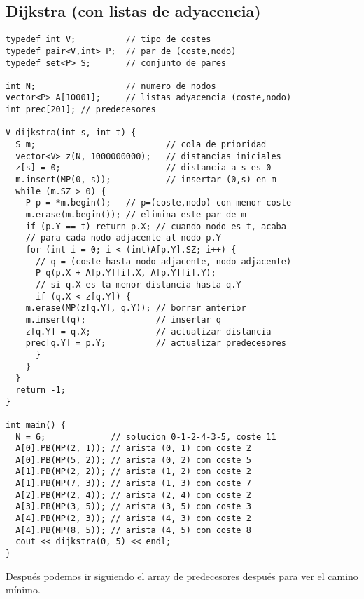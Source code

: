 \documentclass[10pt, a4, oneside]{article}
\begin{document}
\subsection{Dijkstra (con listas de adyacencia)}
\begin{verbatim}
typedef int V;          // tipo de costes
typedef pair<V,int> P;  // par de (coste,nodo)
typedef set<P> S;       // conjunto de pares

int N;                  // numero de nodos
vector<P> A[10001];     // listas adyacencia (coste,nodo)
int prec[201]; // predecesores

V dijkstra(int s, int t) {
  S m;                          // cola de prioridad
  vector<V> z(N, 1000000000);   // distancias iniciales
  z[s] = 0;                     // distancia a s es 0
  m.insert(MP(0, s));           // insertar (0,s) en m
  while (m.SZ > 0) {
    P p = *m.begin();   // p=(coste,nodo) con menor coste
    m.erase(m.begin()); // elimina este par de m
    if (p.Y == t) return p.X; // cuando nodo es t, acaba
    // para cada nodo adjacente al nodo p.Y
    for (int i = 0; i < (int)A[p.Y].SZ; i++) {
      // q = (coste hasta nodo adjacente, nodo adjacente)
      P q(p.X + A[p.Y][i].X, A[p.Y][i].Y);
      // si q.X es la menor distancia hasta q.Y
      if (q.X < z[q.Y]) {
    m.erase(MP(z[q.Y], q.Y)); // borrar anterior
    m.insert(q);              // insertar q
    z[q.Y] = q.X;             // actualizar distancia
    prec[q.Y] = p.Y;          // actualizar predecesores
      }
    }
  }
  return -1;
}

int main() {
  N = 6;             // solucion 0-1-2-4-3-5, coste 11
  A[0].PB(MP(2, 1)); // arista (0, 1) con coste 2
  A[0].PB(MP(5, 2)); // arista (0, 2) con coste 5
  A[1].PB(MP(2, 2)); // arista (1, 2) con coste 2
  A[1].PB(MP(7, 3)); // arista (1, 3) con coste 7
  A[2].PB(MP(2, 4)); // arista (2, 4) con coste 2
  A[3].PB(MP(3, 5)); // arista (3, 5) con coste 3
  A[4].PB(MP(2, 3)); // arista (4, 3) con coste 2
  A[4].PB(MP(8, 5)); // arista (4, 5) con coste 8
  cout << dijkstra(0, 5) << endl;
}
\end{verbatim}
Después podemos ir siguiendo el array de predecesores después para ver el
camino mínimo.
\end{document}

